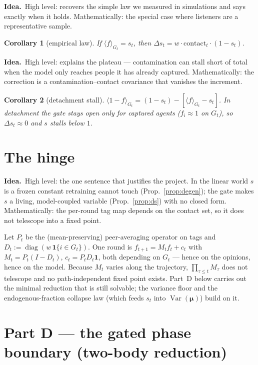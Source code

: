 \documentclass[11pt]{article}
\newtheorem{corollary}{Corollary}
\theoremstyle{definition}
\newcommand{\one}{\mathbf{1}}
\DeclareMathOperator{\Var}{Var}
\DeclareMathOperator{\diag}{diag}
\newcommand{\idea}[1]{\par\medskip\noindent\textbf{Idea.}\ #1\par\medskip}
\begin{document}
\idea{High level: recovers the simple law we measured in simulations and says exactly
when it holds. Mathematically: the special case where listeners are a representative
sample.}
\begin{corollary}[empirical law]\label{cor:emp}
If $\langle f\rangle_{G_t}=s_t$, then $\Delta s_t=w\cdot\mathrm{contact}_t\cdot(1-s_t)$.
\end{corollary}

\idea{High level: explains the plateau --- contamination can stall short of total when
the model only reaches people it has already captured. Mathematically: the correction
is a contamination--contact covariance that vanishes the increment.}
\begin{corollary}[detachment stall]\label{cor:detach}
$\langle 1-f\rangle_{G_t}=(1-s_t)-[\langle f\rangle_{G_t}-s_t]$. In detachment the gate
stays open only for captured agents ($f_i\approx1$ on $G_t$), so $\Delta s_t\approx0$ and
$s$ stalls below $1$.
\end{corollary}

\section{The hinge}

\idea{High level: the one sentence that justifies the project. In the linear world $s$
is a frozen constant retraining cannot touch (Prop.~\ref{prop:degen}); the gate makes
$s$ a living, model-coupled variable (Prop.~\ref{prop:ds}) with no closed form.
Mathematically: the per-round tag map depends on the contact set, so it does not
telescope into a fixed point.}

Let $P_t$ be the (mean-preserving) peer-averaging operator on tags and
$D_t:=\diag(w\,\mathbf 1\{i\in G_t\})$. One round is $f_{t+1}=M_tf_t+c_t$ with
$M_t=P_t(I-D_t)$, $c_t=P_tD_t\one$, both depending on $G_t$ --- hence on the opinions,
hence on the model. Because $M_t$ varies along the trajectory, $\prod_{\tau\le t}M_\tau$
does not telescope and no path-independent fixed point exists. Part~D below carries out
the minimal reduction that is still solvable; the variance floor and the
endogenous-fraction collapse law (which feeds $s_t$ into $\Var(\bm{\mu})$) build on it.

\section{Part D --- the gated phase boundary (two-body reduction)}
\end{document}
